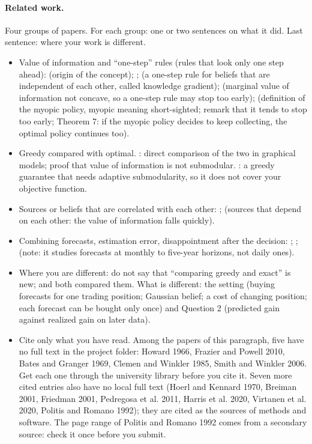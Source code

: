 \documentclass{article}
\newif\ifnotes
\newenvironment{pts}{\begin{itemize}[nosep,leftmargin=1.15em,topsep=1pt]}{\end{itemize}}
\begin{document}
\paragraph{Related work.}\ifnotes\mbox{}\par\vspace{-3pt}\fi
\begin{note}
Four groups of papers. For each group: one or two sentences on what it did. Last sentence: where your work is different.
\begin{pts}
\item Value of information and ``one-step'' rules (rules that look only one step ahead): \citet{howard1966information} (origin of the concept); \citet{russell1991principles}; \citet{frazier2008kg} (a one-step rule for beliefs that are independent of each other, called knowledge gradient); \citet{frazier2010paradoxes} (marginal value of information not concave, so a one-step rule may stop too early); \citet{hay2012selecting} (definition of the myopic policy, myopic meaning short-sighted; remark that it tends to stop too early; Theorem 7: if the myopic policy decides to keep collecting, the optimal policy continues too).
\item Greedy compared with optimal. \citet{krause2009optimal}: direct comparison of the two in graphical models; proof that value of information is not submodular. \citet{golovin2011adaptive}: a greedy guarantee that needs adaptive submodularity, so it does not cover your objective function.
\item Sources or beliefs that are correlated with each other: \citet{frazier2009correlated}; \citet{clemen1985limits} (sources that depend on each other: the value of information falls quickly).
\item Combining forecasts, estimation error, disappointment after the decision: \citet{bates1969combination}; \citet{smith2006optimizer}; \citet{welch2008comprehensive} (note: it studies forecasts at monthly to five-year horizons, not daily ones).
\item Where you are different: do not say that ``comparing greedy and exact'' is new; \citet{krause2009optimal} and \citet{hay2012selecting} both compared them. What is different: the setting (buying forecasts for one trading position; Gaussian belief; a cost of changing position; each forecast can be bought only once) and Question 2 (predicted gain against realized gain on later data).
\item Cite only what you have read. Among the papers of this paragraph, five have no full text in the project folder: Howard 1966, Frazier and Powell 2010, Bates and Granger 1969, Clemen and Winkler 1985, Smith and Winkler 2006. Get each one through the university library before you cite it. Seven more cited entries also have no local full text (Hoerl and Kennard 1970, Breiman 2001, Friedman 2001, Pedregosa et al. 2011, Harris et al. 2020, Virtanen et al. 2020, Politis and Romano 1992); they are cited as the sources of methods and software. The page range of Politis and Romano 1992 comes from a secondary source: check it once before you submit.

\end{pts}
\end{note}
\end{document}
